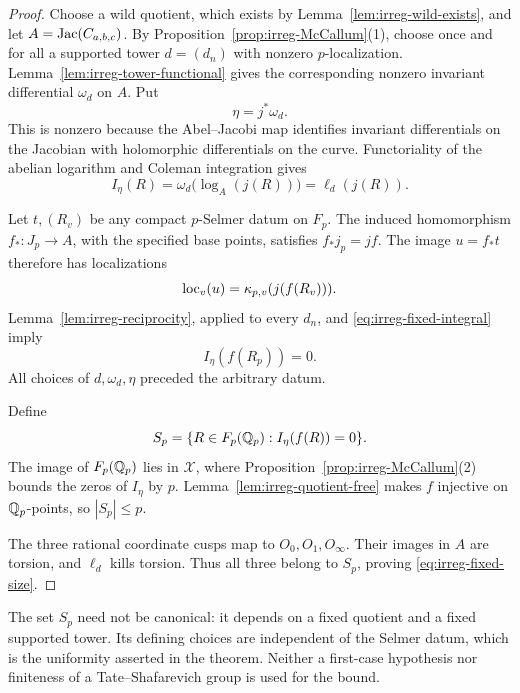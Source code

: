 \begin{proof}
Choose a wild quotient, which exists by
Lemma~\ref{lem:irreg-wild-exists}, and let \(A=\operatorname{Jac}(C_{a,b,c})\).
By Proposition~\ref{prop:irreg-McCallum}(1), choose once and for all
a supported tower \(d=(d_n)\) with nonzero \(p\)-localization.
Lemma~\ref{lem:irreg-tower-functional} gives the corresponding
nonzero invariant differential \(\omega_d\) on \(A\).
Put
\[
 \eta=j^*\omega_d.
\]
This is nonzero because the Abel--Jacobi map identifies invariant
differentials on the Jacobian with holomorphic differentials on
the curve. Functoriality of the abelian logarithm and Coleman
integration gives
\begin{equation}
 I_\eta(R)=\omega_d\bigl(\log_A(j(R))\bigr)
           =\ell_d(j(R)).
 \label{eq:irreg-fixed-integral}
\end{equation}

Let \(t,(R_v)\) be any compact \(p\)-Selmer datum on \(F_p\).
The induced homomorphism \(f_*:J_p\to A\), with the specified base
points, satisfies \(f_*j_p=jf\). The image \(u=f_*t\) therefore has
localizations
\[
 \operatorname{loc}_v(u)=\kappa_{p,v}(j(f(R_v))).
\]
Lemma~\ref{lem:irreg-reciprocity}, applied to every \(d_n\), and
\eqref{eq:irreg-fixed-integral} imply
\[
 I_\eta(f(R_p))=0.
\]
All choices of \(d,\omega_d,\eta\) preceded the arbitrary datum.

Define
\begin{equation}
 S_p=
 \{R\in F_p(\mathbb Q_p): I_\eta(f(R))=0\}.
 \label{eq:irreg-fixed-set}
\end{equation}
The image of \(F_p(\mathbb Q_p)\) lies in \(\mathcal X\), where
Proposition~\ref{prop:irreg-McCallum}(2) bounds the zeros of
\(I_\eta\) by \(p\). Lemma~\ref{lem:irreg-quotient-free} makes \(f\)
injective on \(\mathbb Q_p\)-points, so \(|S_p|\leq p\).

The three rational coordinate cusps map to \(O_0,O_1,O_\infty\).
Their images in \(A\) are torsion, and \(\ell_d\) kills torsion.
Thus all three belong to \(S_p\), proving \eqref{eq:irreg-fixed-size}.
\end{proof}

\begin{remark}\label{rem:irreg-uniform}
The set \(S_p\) need not be canonical: it depends on a fixed quotient
and a fixed supported tower. Its defining choices are independent
of the Selmer datum, which is the uniformity asserted in the
theorem. Neither a first-case hypothesis nor finiteness of a
Tate--Shafarevich group is used for the bound.
\end{remark}

